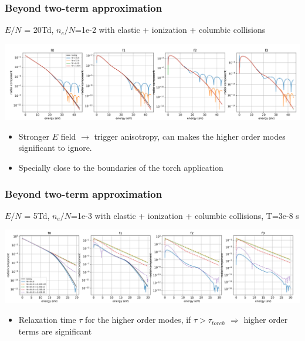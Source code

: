 \documentclass[mathserif, aspectratio=169]{beamer}
\begin{document}
\begin{frame}
	\frametitle{Beyond two-term approximation}
	$E/N$ = 20Td, $n_e/N$=1e-2 with elastic + ionization + columbic collisions
	\begin{center}
		\includegraphics[width=\textwidth]{20Td_lmax3_ion_deg_1e-2.png}
	\end{center}
	\begin{itemize}
		\item Stronger $E$ field $\rightarrow$ trigger anisotropy, can makes the higher order modes significant to ignore.
		\item Specially close to the boundaries of the torch application
	\end{itemize}  
\end{frame}

\begin{frame}
	\frametitle{Beyond two-term approximation}
	$E/N$ = 5Td, $n_e/N$=1e-3 with elastic + ionization + columbic collisions, T=3e-8 s
	\begin{center}
		\includegraphics[width=\textwidth]{5Td_transient_ion_deg_1e-3.png}
	\end{center}
	\begin{itemize}
		\item Relaxation time $\tau$ for the higher order modes, if $\tau > \tau_{torch}$ $\Rightarrow$ higher order terms are significant
	\end{itemize}
\end{frame}
\end{document}
